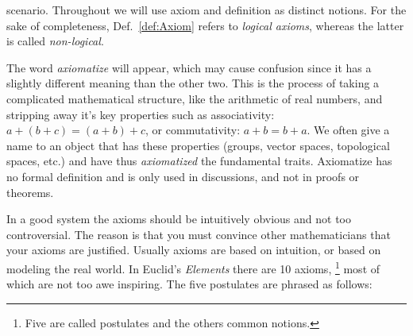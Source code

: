         scenario. Throughout we will use axiom and definition as distinct
        notions. For the sake of completeness, Def.~\ref{def:Axiom} refers to
        \textit{logical axioms}, whereas the latter
        is called \textit{non-logical}.
        \par\hfill\par
        The word \textit{axiomatize} will appear, which
        may cause confusion since it has a slightly different meaning than the
        other two. This is the process of taking a complicated mathematical
        structure, like the arithmetic of real numbers, and stripping away it's
        key properties such as associativity: $a+(b+c)=(a+b)+c$, or
        commutativity: $a+b=b+a$. We often give a name to an object that has
        these properties (groups, vector spaces, topological spaces, etc.) and
        have thus \textit{axiomatized} the fundamental traits. Axiomatize has no
        formal definition and is only used in discussions, and not in proofs or
        theorems.
        \par\hfill\par
        In a good system the axioms should be intuitively obvious and not too
        controversial. The reason is that you must convince other mathematicians
        that your axioms are justified. Usually axioms are based on intuition,
        or based on modeling the real world. In Euclid's \textit{Elements}%
         there are 10 axioms,%
        \footnote{%
            Five are called postulates and the others common notions.%
        }
        most of which are not too awe inspiring. The five postulates are phrased
        as follows:
